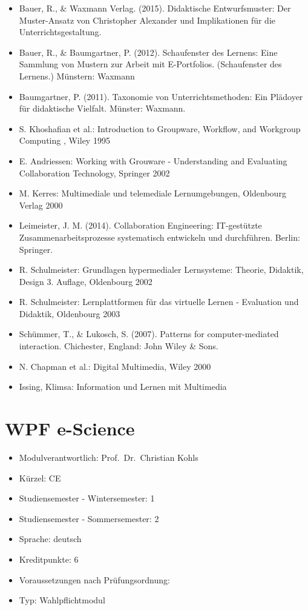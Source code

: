 \begin{itemize}
\item
  Bauer, R., \& Waxmann Verlag. (2015). Didaktische Entwurfsmuster: Der
  Muster-Ansatz von Christopher Alexander und Implikationen für die
  Unterrichtsgestaltung.
\item
  Bauer, R., \& Baumgartner, P. (2012). Schaufenster des Lernens: Eine
  Sammlung von Mustern zur Arbeit mit E-Portfolios. (Schaufenster des
  Lernens.) Münstern: Waxmann
\item
  Baumgartner, P. (2011). Taxonomie von Unterrichtsmethoden: Ein
  Plädoyer für didaktische Vielfalt. Münster: Waxmann.
\item
  S. Khoshafian et al.: Introduction to Groupware, Workflow, and
  Workgroup Computing , Wiley 1995
\item
  E. Andriessen: Working with Grouware - Understanding and Evaluating
  Collaboration Technology, Springer 2002
\item
  M. Kerres: Multimediale und telemediale Lernumgebungen, Oldenbourg
  Verlag 2000
\item
  Leimeister, J. M. (2014). Collaboration Engineering: IT-gestützte
  Zusammenarbeitsprozesse systematisch entwickeln und durchführen.
  Berlin: Springer.
\item
  R. Schulmeister: Grundlagen hypermedialer Lernsysteme: Theorie,
  Didaktik, Design 3. Auflage, Oldenbourg 2002
\item
  R. Schulmeister: Lernplattformen für das virtuelle Lernen - Evaluation
  und Didaktik, Oldenbourg 2003
\item
  Schümmer, T., \& Lukosch, S. (2007). Patterns for computer-mediated
  interaction. Chichester, England: John Wiley \& Sons.
\item
  N. Chapman et al.: Digital Multimedia, Wiley 2000
\item
  Issing, Klimsa: Information und Lernen mit Multimedia
\end{itemize}

\chapter{WPF e-Science}\label{wpf-e-science}

\begin{itemize}
\tightlist
\item
  Modulverantwortlich: Prof.~Dr.~Christian Kohls
\item
  Kürzel: CE
\item
  Studiensemester - Wintersemester: 1
\item
  Studiensemester - Sommersemester: 2
\item
  Sprache: deutsch
\item
  Kreditpunkte: 6
\item
  Voraussetzungen nach Prüfungsordnung:
\item
  Typ: Wahlpflichtmodul
\end{itemize}

